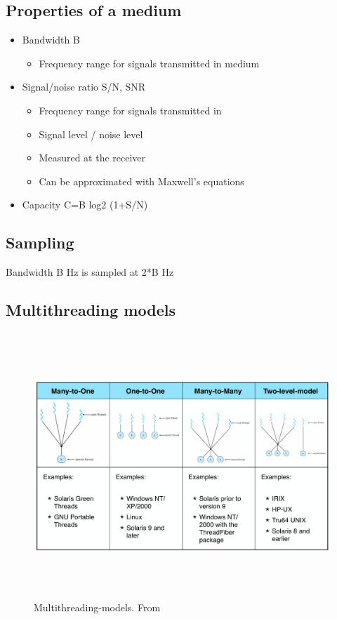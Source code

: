 \begin{multicols}{2}
\subsection{Properties of a medium}
\begin{itemize}
\item Bandwidth B
  \begin{itemize}
    \item Frequency range for signals transmitted in medium
  \end{itemize}
\item Signal/noise ratio S/N, SNR
  \begin{itemize}
    \item Frequency range for signals transmitted in
    \item Signal level / noise level
    \item Measured at the receiver
    \item Can be approximated with Maxwell’s equations
  \end{itemize}
\item Capacity C=B log2 (1+S/N)
\end{itemize}

\subsection{Sampling}
Bandwidth B Hz is sampled at 2*B Hz

\subsection{Multithreading models}
\begin{figure}[h]
    \vspace{10mm}
    \centering
    \includegraphics[width=16cm, height=10cm]{image/Multithreading-models.png}
    \caption{Multithreading-models. From \cite{}}
\end{figure}


\end{multicols}
